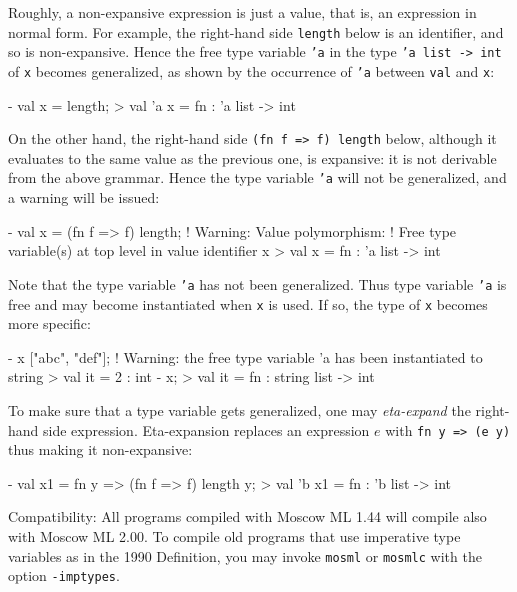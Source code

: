 \documentclass[fleqn,a4paper]{article}
\begin{document}
\noindent Roughly, a non-expansive expression is just a value, that
is, an expression in normal form.  For example, the right-hand side
{\tt length} below is an identifier, and so is non-expansive.  Hence
the free type variable {\tt 'a} in the type {\tt 'a list -> int} of
{\tt x} becomes generalized, as shown by the occurrence of \texttt{'a}
between \texttt{val} and \texttt{x}:

\begin{program}
- val x = length;
> val 'a x = fn : 'a list -> int
\end{program}

\noindent On the other hand, the right-hand side {\tt (fn f => f)
  length} below, although it evaluates to the same value as the
previous one, is expansive: it is not derivable from the above
grammar.  Hence the type variable {\tt 'a} will not be generalized,
and a warning will be issued:

\begin{program}
- val x = (fn f => f) length;
! Warning: Value polymorphism: 
! Free type variable(s) at top level in value identifier x
> val x = fn : 'a list -> int
\end{program}

\noindent Note that the type variable \texttt{'a} has not been
generalized.  Thus type variable \texttt{'a} is free and may become
instantiated when \texttt{x} is used.  If so, the type of \texttt{x}
becomes more specific:

\begin{program}
- x ["abc", "def"];
! Warning: the free type variable 'a has been instantiated to string
> val it = 2 : int
- x;
> val it = fn : string list -> int
\end{program}

\noindent To make sure that a type variable gets generalized, one may {\em
  eta-expand\/} the right-hand side expression.  Eta-expansion
replaces an expression $e$ with \texttt{fn y => (e y)} thus making it
non-expansive:

\begin{program}
- val x1 = fn y => (fn f => f) length y;
> val 'b x1 = fn : 'b list -> int
\end{program}

\noindent Compatibility: All programs compiled with Moscow ML 1.44
will compile also with Moscow ML 2.00\@.  To compile old programs that
use imperative type variables as in the 1990 Definition, you may
invoke {\tt mosml} or {\tt mosmlc} with the option {\tt -imptypes}.
\end{document}
